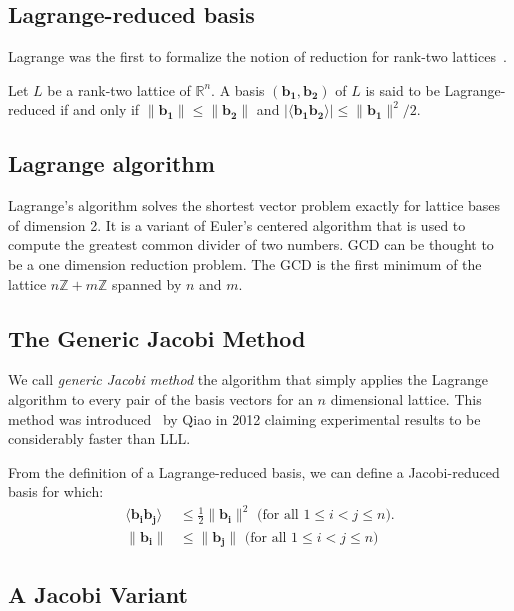 \documentclass[10pt, a4paper]{article}
\renewcommand{\vec}[1]{\mathbf{#1}}
\begin{document}
\subsection{Lagrange-reduced basis}

Lagrange was the first to formalize the notion of reduction for rank-two lattices~\cite{lagrangeArithmetique}.

Let $L$ be a rank-two lattice of $\mathbb{R}^n$. A basis $(\vec{b_1}, \vec{b_2})$ of $L$ is said to be Lagrange-reduced if and only if $\|\vec{b_1}\| \leq \|\vec{b_2}\|$ and $| \langle \vec{b_1} \vec{b_2} \rangle | \leq \| \vec{b_1} \|^2 / 2 $. 

\subsection{Lagrange algorithm}
\label{sec:lagrangeAlgorithm}

Lagrange's algorithm solves the shortest vector problem exactly for lattice bases of dimension 2. It is a variant of Euler's centered algorithm that is used to compute the greatest common divider of two numbers. GCD can be thought to be a one dimension reduction problem. The GCD is the first minimum of the lattice $n \mathbb{Z} + m \mathbb{Z}$ spanned by $n$ and $m$.


\subsection{The Generic Jacobi Method}
We call \emph{generic Jacobi method} the algorithm that simply applies the Lagrange algorithm to every pair of the basis vectors for an $n$ dimensional lattice. This method was introduced~\cite{originalJacobiMethodLatticeBasisReduction} by Qiao in 2012 claiming experimental results to be considerably faster than LLL.

From the definition of a Lagrange-reduced basis, we can define a Jacobi-reduced basis for which:
\begin{align}
\langle \vec{b_i} \vec{b_j} \rangle &\leq \frac{1}{2} \| \vec{b_i}\|^2 \text{ (for all $1 \leq i < j \leq n$)}.\\
\| \vec{b_i}\| &\leq \|\vec{b_j} \| \text{ (for all $1 \leq i < j \leq n$)}
\end{align}




\subsection{A Jacobi Variant}
\end{document}
